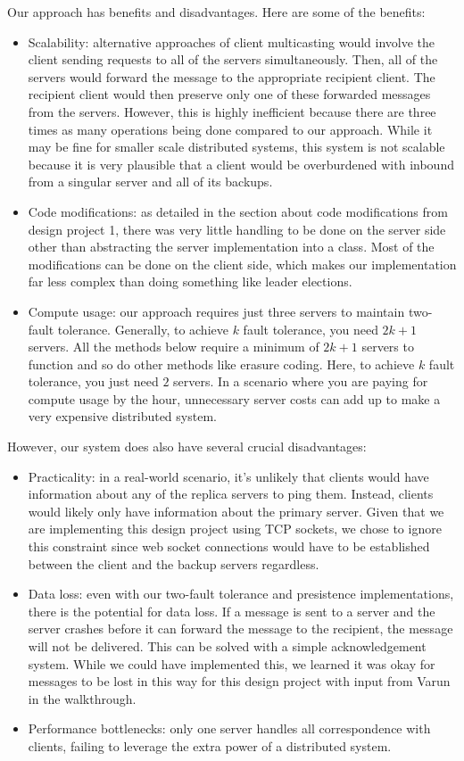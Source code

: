\documentclass[
	a4paper, %
	10pt, %
	unnumberedsections, %
	twoside, %
]{LTJournalArticle}
\begin{document}
Our approach has benefits and disadvantages. Here are some of the benefits: 
\begin{itemize}
    \item Scalability: alternative approaches of client multicasting would involve the client sending requests to all of the servers simultaneously. Then, all of the servers would forward the message to the appropriate recipient client. The recipient client would then preserve only one of these forwarded messages from the servers. However, this is highly inefficient because there are three times as many operations being done compared to our approach. While it may be fine for smaller scale distributed systems, this system is not scalable because it is very plausible that a client would be overburdened with inbound from a singular server and all of its backups. 
    \item Code modifications: as detailed in the section about code modifications from design project 1, there was very little handling to be done on the server side other than abstracting the server implementation into a class. Most of the modifications can be done on the client side, which makes our implementation far less complex than doing something like leader elections. 
    \item Compute usage: our approach requires just three servers to maintain two-fault tolerance. Generally, to achieve $k$ fault tolerance, you need $2k + 1$ servers. All the methods below require a minimum of $2k + 1$ servers to function and so do other methods like erasure coding. Here, to achieve $k$ fault tolerance, you just need $2$ servers. In a scenario where you are paying for compute usage by the hour, unnecessary server costs can add up to make a very expensive distributed system. 
\end{itemize}

However, our system does also have several crucial disadvantages: 
\begin{itemize}
    \item Practicality: in a real-world scenario, it's unlikely that clients would have information about any of the replica servers to ping them. Instead, clients would likely only have information about the primary server. Given that we are implementing this design project using TCP sockets, we chose to ignore this constraint since web socket connections would have to be established between the client and the backup servers regardless. 
    \item Data loss: even with our two-fault tolerance and presistence implementations, there is the potential for data loss. If a message is sent to a server and the server crashes before it can forward the message to the recipient, the message will not be delivered. This can be solved with a simple acknowledgement system. While we could have implemented this, we learned it was okay for messages to be lost in this way for this design project with input from Varun in the walkthrough. 
    \item Performance bottlenecks: only one server handles all correspondence with clients, failing to leverage the extra power of a distributed system. 
\end{itemize}
\end{document}
